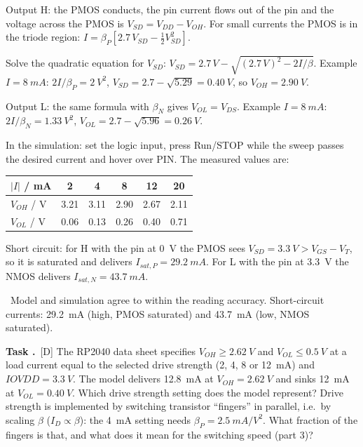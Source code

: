 \documentclass[a4paper,11pt]{article}
\newcounter{task}[section]
\renewcommand{\thetask}{\thesection.\arabic{task}}
\newcommand{\task}[1]{\par\medskip\refstepcounter{task}%
  {\sffamily\bfseries\color{rwuviolet}Task \thetask}\ {\sffamily\small\color{rwucyandark}[#1]}\quad}
\newenvironment{solution}{\begin{solbox}}{\end{solbox}}
\newcommand{\answer}{\par\smallskip{\sffamily\bfseries\color{rwuviolet}Answer:}\ }
\begin{document}
\begin{solution}
\begin{steps}
  \item Output \textsf{H}: the PMOS conducts, the pin current flows out of the pin and the voltage across the
        PMOS is $V_{SD}=V_{DD}-V_{OH}$. For small currents the PMOS is in the triode region:
        $I=\beta_P\left[2.7\,V_{SD}-\tfrac12V_{SD}^2\right]$.
  \item Solve the quadratic equation for $V_{SD}$: $V_{SD}=2.7\,\si{V}-\sqrt{(2.7\,\si{V})^2-2I/\beta}$.
        Example $I=\SI{8}{mA}$: $2I/\beta_P=\SI{2}{V^2}$, $V_{SD}=2.7-\sqrt{5.29}=\SI{0.40}{V}$, so
        $V_{OH}=\SI{2.90}{V}$.
  \item Output \textsf{L}: the same formula with $\beta_N$ gives $V_{OL}=V_{DS}$. Example $I=\SI{8}{mA}$:
        $2I/\beta_N=\SI{1.33}{V^2}$, $V_{OL}=2.7-\sqrt{5.96}=\SI{0.26}{V}$.
  \item In the simulation: set the logic input, press Run/STOP while the sweep passes the desired current and
        hover over PIN. The measured values are:\\[1mm]
\begin{tabular}{lccccc}
  \toprule
  $|I|$ / mA & 2 & 4 & 8 & 12 & 20\\
  \midrule
  $V_{OH}$ / V & 3.21 & 3.11 & 2.90 & 2.67 & 2.11\\
  $V_{OL}$ / V & 0.06 & 0.13 & 0.26 & 0.40 & 0.71\\
  \bottomrule
\end{tabular}
  \item Short circuit: for \textsf{H} with the pin at \SI{0}{V} the PMOS sees $V_{SD}=\SI{3.3}{V}>V_{GS}-V_T$, so it
        is saturated and delivers $I_{sat,P}=\SI{29.2}{mA}$. For \textsf{L} with the pin at \SI{3.3}{V} the NMOS
        delivers $I_{sat,N}=\SI{43.7}{mA}$.
\end{steps}
\answer Model and simulation agree to within the reading accuracy. Short-circuit currents: \SI{29.2}{mA}
(high, PMOS saturated) and \SI{43.7}{mA} (low, NMOS saturated).
\end{solution}

\task{D} The RP2040 data sheet specifies $V_{OH}\ge\SI{2.62}{V}$ and $V_{OL}\le\SI{0.5}{V}$ at a load current
equal to the selected drive strength (2, 4, 8 or \SI{12}{mA}) and $IOVDD=\SI{3.3}{V}$. The model delivers
\SI{12.8}{mA} at $V_{OH}=\SI{2.62}{V}$ and sinks \SI{12}{mA} at $V_{OL}=\SI{0.40}{V}$. Which drive strength setting
does the model represent? Drive strength is implemented by switching transistor ``fingers'' in parallel, i.e.\ by
scaling $\beta$ ($I_D\propto\beta$): the \SI{4}{mA} setting needs $\beta_P=\SI{2.5}{mA/V^2}$. What fraction of
the fingers is that, and what does it mean for the switching speed (part 3)?
\end{document}
